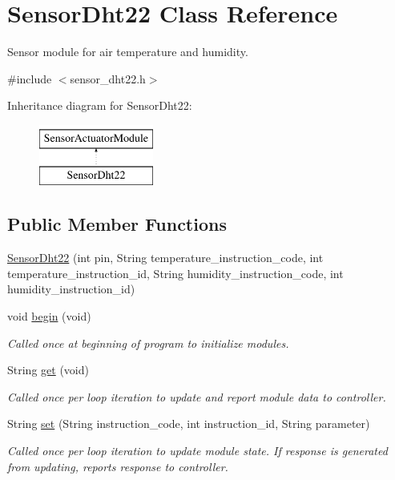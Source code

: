 \hypertarget{class_sensor_dht22}{}\section{Sensor\+Dht22 Class Reference}
\label{class_sensor_dht22}


Sensor module for air temperature and humidity.  




{\ttfamily \#include $<$sensor\+\_\+dht22.\+h$>$}

Inheritance diagram for Sensor\+Dht22\+:\begin{figure}[H]
\begin{center}
\leavevmode
\includegraphics[height=2.000000cm]{class_sensor_dht22}
\end{center}
\end{figure}
\subsection*{Public Member Functions}
\begin{DoxyCompactItemize}
\item 
\hyperlink{class_sensor_dht22_a417840f2a31737059e6b0885d89de32f}{Sensor\+Dht22} (int pin, String temperature\+\_\+instruction\+\_\+code, int temperature\+\_\+instruction\+\_\+id, String humidity\+\_\+instruction\+\_\+code, int humidity\+\_\+instruction\+\_\+id)
\item 
void \hyperlink{class_sensor_dht22_ae4de2976d82d060c9dc12bf84195a347}{begin} (void)
\begin{DoxyCompactList}\small\item\em Called once at beginning of program to initialize modules. \end{DoxyCompactList}\item 
String \hyperlink{class_sensor_dht22_ad939eefeb967eea7029d9505cc6aad6f}{get} (void)
\begin{DoxyCompactList}\small\item\em Called once per loop iteration to update and report module data to controller. \end{DoxyCompactList}\item 
String \hyperlink{class_sensor_dht22_a177a42edbc33d5cf4fa0c4c38dc0047c}{set} (String instruction\+\_\+code, int instruction\+\_\+id, String parameter)
\begin{DoxyCompactList}\small\item\em Called once per loop iteration to update module state. If response is generated from updating, reports response to controller. \end{DoxyCompactList}\end{DoxyCompactItemize}
